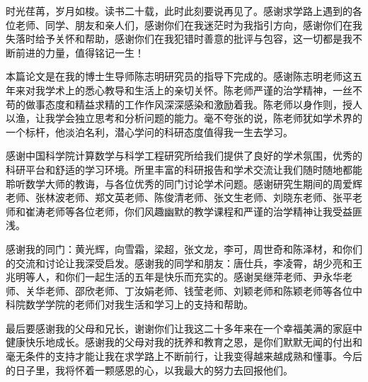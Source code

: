 ﻿
\begin{thanks}
时光荏苒，岁月如梭。读书二十载，此时此刻要说再见了。感谢求学路上遇到的各位老师、同学、朋友和亲人们，感谢你们在我迷茫时为我指引方向，感谢你们在我失落时给予关怀和帮助，感谢你们在我犯错时善意的批评与包容，这一切都是我不断前进的力量，值得铭记一生！

本篇论文是在我的博士生导师陈志明研究员的指导下完成的。感谢陈志明老师这五年来对我学术上的悉心教导和生活上的亲切关怀。陈老师严谨的治学精神，一丝不苟的做事态度和精益求精的工作作风深深感染和激励着我。陈老师以身作则，授人以渔，让我学会独立思考和分析问题的能力。毫不夸张的说，陈老师犹如学术界的一个标杆，他淡泊名利，潜心学问的科研态度值得我一生去学习。

感谢中国科学院计算数学与科学工程研究所给我们提供了良好的学术氛围，优秀的科研平台和舒适的学习环境。所里丰富的科研报告和学术交流让我们随时随地都能聆听数学大师的教诲，与各位优秀的同门讨论学术问题。感谢研究生期间的周爱辉老师、张林波老师、郑文英老师、陈俊清老师、张文生老师、刘晓东老师、张平老师和崔涛老师等各位老师，你们风趣幽默的教学课程和严谨的治学精神让我受益匪浅。


感谢我的同门：黄光辉，向雪霜，梁超，张文龙，李可，周世奇和陈泽材，和你们的交流和讨论让我深受启发。感谢我的同学和朋友：唐仕兵，李凌霄，胡少亮和王兆明等人，和你们一起生活的五年是快乐而充实的。感谢吴继萍老师、尹永华老师、关华老师、邵欣老师、丁汝娟老师、钱莹老师、刘颖老师和陈颖老师等各位中科院数学学院的老师们对我生活和学习上的支持和帮助。

最后要感谢我的父母和兄长，谢谢你们让我这二十多年来在一个幸福美满的家庭中健康快乐地成长。感谢我的父母对我的抚养和教育之恩，是你们默默无闻的付出和毫无条件的支持才能让我在求学路上不断前行，让我变得越来越成熟和懂事。今后的日子里，我将怀着一颗感恩的心，以我最大的努力去回报他们。




\end{thanks}
